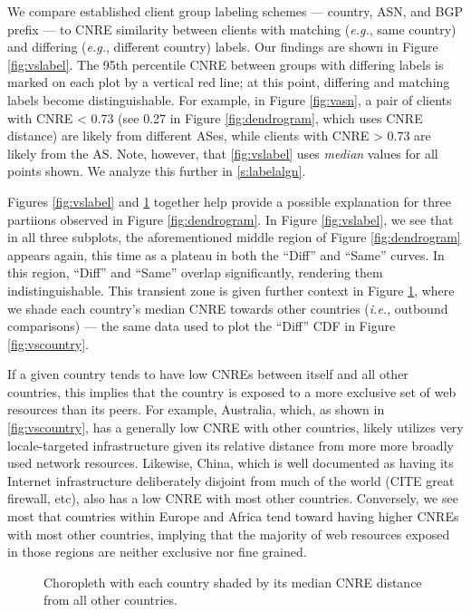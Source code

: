 We compare established client group labeling schemes  ---
country, ASN, and BGP prefix --- to CNRE similarity between clients with
matching (\emph{e.g.}, same country) and differing (\emph{e.g.}, different
country) labels. Our findings are shown in Figure \ref{fig:vslabel}. The 95th percentile CNRE between groups with differing labels
is marked on each plot by a vertical red line; at this point,
differing and matching labels become distinguishable. For example, in Figure
\ref{fig:vasn}, a pair of clients with CNRE < 0.73 (see 0.27 in
Figure \ref{fig:dendrogram}, which uses CNRE distance) are likely from different
ASes, while clients with CNRE > 0.73 are likely from the AS. Note, however, that
\ref{fig:vslabel} uses \emph{median} values for all points shown. We analyze
this further in \ref{s:labelalgn}. 


Figures \ref{fig:vslabel} and \ref{fig:cnredist} together help provide a possible
explanation for three partiions observed in Figure \ref{fig:dendrogram}. In
Figure \ref{fig:vslabel}, we see that in all three subplots, the aforementioned
middle region of Figure \ref{fig:dendrogram} appears again, this time as a
plateau in both the ``Diff'' and ``Same'' curves. In this region, ``Diff'' and
``Same'' overlap significantly, rendering them indistinguishable. This transient
zone is given further context in Figure \ref{fig:cnredist}, where we shade each
country's median CNRE towards other countries (\emph{i.e.}, outbound
comparisons) --- the same data used to plot the
``Diff'' CDF in Figure \ref{fig:vscountry}. 

If a given country tends to have low CNREs between itself and all other
countries, this implies that the country is exposed to a more exclusive set of
web resources than its peers. For example, Australia, which, as shown in
\ref{fig:vscountry}, has a generally low CNRE with other countries, likely
utilizes very locale-targeted infrastructure given its relative distance from
more more broadly used network resources. Likewise, China, which is well
documented as having its Internet infrastructure deliberately disjoint from much
of the world (CITE great firewall, etc), also has a low CNRE with most other
countries. Conversely, we see most that countries within Europe and Africa tend
toward having higher CNREs with most other countries, implying that the majority
of web resources exposed in those regions are neither exclusive nor fine grained. 

\begin{figure}


    \caption{Choropleth with each country shaded by its median CNRE distance
    from all other countries.}
    \label{fig:cnredist}

\end{figure}

